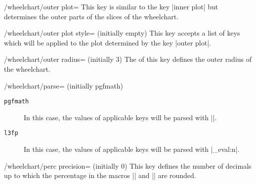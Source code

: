 \documentclass[a4paper,english,dvipsnames]{ltxdoc}
\begin{document}
\begin{key}{/wheelchart/outer plot=}
This key is similar to the key |inner plot| but determines the outer parts of the slices of the wheelchart.
\begin{codeexample}[]
\begin{tikzpicture}
\wheelchart[
    inner plot={{#1}:{#2+0.2*(cos(#1*\WCtotalcount)+1)}},
    outer plot={{#1}:{#2+0.2*(cos(#1*\WCtotalcount*2)+1)}}
]{\exampleforthismanual}
\end{tikzpicture}
\end{codeexample}
\begin{codeexample}[]
\begin{tikzpicture}
\wheelchart[
    arc data=\WCvarC,
    arc data pos=0.5,
    data=,
    domain=0:450,
    inner plot={
        {int((#1)/180)*5+(0.5-((-1)^Mod(int((#1)/180),2))*2.5)*cos(#1)},
        {(2.5-((-1)^Mod(int((#1)/180),2))*0.5)*sin(#1)}
    },
    outer plot={
        {int((#1)/180)*5+(-0.5-((-1)^Mod(int((#1)/180),2))*2.5)*cos(#1)},
        {(2.5+((-1)^Mod(int((#1)/180),2))*0.5)*sin(#1)}
    },
    value=1
]{\exampleforthismanual}
\end{tikzpicture}
\end{codeexample}
\end{key}
\begin{stylekey}{/wheelchart/outer plot style= (initially \normalfont empty)}
This key accepts a list of keys which will be applied to the plot determined by the key |outer plot|.
\end{stylekey}
\begin{key}{/wheelchart/outer radius= (initially 3)}
The  of this key defines the outer radius of the wheelchart.
\end{key}
\begin{key}{/wheelchart/parse= (initially pgfmath)}
\begin{description}
\item[\texttt{pgfmath}] In this case, the values of applicable keys will be parsed with |\pgfmathparse|.
\item[\texttt{l3fp}] In this case, the values of applicable keys will be parsed with |\fp_eval:n|.
\end{description}
\end{key}
\begin{key}{/wheelchart/perc precision= (initially 0)}
This key defines the number of decimals up to which the percentage in the macros |\WCperc| and |\WCpercentagerounded| are rounded.
\end{key}
\end{document}
